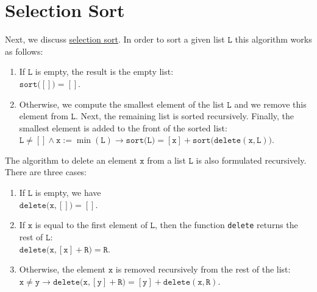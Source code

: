 \section{Selection Sort}
Next, we discuss 
\href{http://en.wikipedia.org/wiki/Selection_sort}{selection sort}.  In order to sort a
given list $\texttt{L}$ this algorithm works as
follows:
\begin{enumerate}
\item If $\texttt{L}$ is empty, the result is the empty list: \\[0.2cm]
      \hspace*{1.3cm} $\mathtt{sort}\bigl([]\bigr) = []$.
\item Otherwise, we compute the smallest element of the list $\texttt{L}$ and we remove this element from
      $\texttt{L}$.  Next, the remaining list is sorted recursively.  Finally, the smallest element is added
      to the front of the sorted list:
      \\[0.2cm]
      \hspace*{1.3cm} 
      $\texttt{L} \not= [] \wedge \texttt{x} := \min(\texttt{L}) \rightarrow \mathtt{sort}\bigl(\texttt{L}\bigr) = [\texttt{x}] + \mathtt{sort}\bigl(\mathtt{delete}(\texttt{x}, \texttt{L})\bigr)$.
\end{enumerate}
The algorithm to delete an element $\texttt{x}$ from a list $\texttt{L}$ is also formulated recursively.  There are three cases:
\begin{enumerate}
\item If $\texttt{L}$ is empty, we have \\[0.2cm]
      \hspace*{1.3cm} $\mathtt{delete}\bigl(\texttt{x}, []\bigr) = []$.
\item If $\texttt{x}$ is equal to the first element of $\texttt{L}$, then the function \texttt{delete} returns the
      rest of $\texttt{L}$: \\[0.2cm]
      \hspace*{1.3cm} 
      $\mathtt{delete}\bigl(\texttt{x}, [\texttt{x}] + \texttt{R}\bigr) = \texttt{R}$.
\item Otherwise, the element $\texttt{x}$ is removed recursively from the rest of the list: \\[0.2cm]
      \hspace*{1.3cm}   
      $\texttt{x} \not = \texttt{y} \rightarrow \mathtt{delete}\bigl(\texttt{x}, [\texttt{y}] + \texttt{R}\bigr) = [\texttt{y}] + \mathtt{delete}(\texttt{x},\texttt{R})$.
\end{enumerate}
